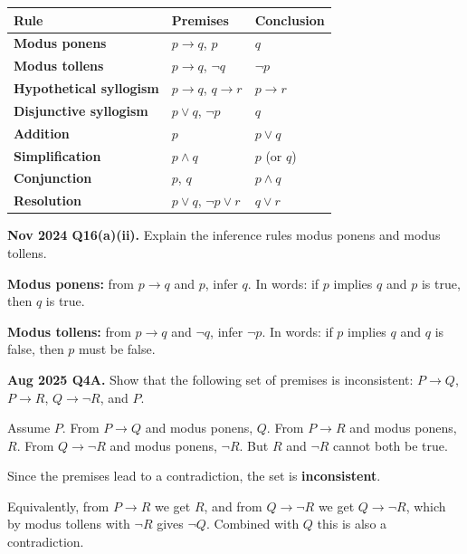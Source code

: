 \documentclass[11pt,a4paper]{article}
\begin{document}
\begin{center}\small
\begin{tabularx}{\textwidth}{>{\bfseries}p{} X X}
\toprule Rule & Premises & Conclusion\\\midrule
Modus ponens & $p\to q$, $p$ & $q$\\
Modus tollens & $p\to q$, $\neg q$ & $\neg p$\\
Hypothetical syllogism & $p\to q$, $q\to r$ & $p\to r$\\
Disjunctive syllogism & $p\lor q$, $\neg p$ & $q$\\
Addition & $p$ & $p\lor q$\\
Simplification & $p\land q$ & $p$ (or $q$)\\
Conjunction & $p$, $q$ & $p\land q$\\
Resolution & $p\lor q$, $\neg p\lor r$ & $q\lor r$\\
\end{tabularx}
\end{center}

\begin{pyqbox}
\textbf{Nov 2024 Q16(a)(ii).} Explain the inference rules modus ponens and modus tollens.
\end{pyqbox}

\begin{solbox}
\textbf{Modus ponens:} from $p\to q$ and $p$, infer $q$. In words: if $p$ implies $q$ and $p$ is true, then $q$ is true.

\textbf{Modus tollens:} from $p\to q$ and $\neg q$, infer $\neg p$. In words: if $p$ implies $q$ and $q$ is false, then $p$ must be false.
\end{solbox}

\begin{pyqbox}
\textbf{Aug 2025 Q4A.} Show that the following set of premises is inconsistent: $P\to Q$, $P\to R$, $Q\to\neg R$, and $P$.
\end{pyqbox}

\begin{solbox}
Assume $P$. From $P\to Q$ and modus ponens, $Q$. From $P\to R$ and modus ponens, $R$. From $Q\to\neg R$ and modus ponens, $\neg R$. But $R$ and $\neg R$ cannot both be true.

Since the premises lead to a contradiction, the set is \textbf{inconsistent}.

Equivalently, from $P\to R$ we get $R$, and from $Q\to\neg R$ we get $Q\to\neg R$, which by modus tollens with $\neg R$ gives $\neg Q$. Combined with $Q$ this is also a contradiction.
\end{solbox}
\end{document}
